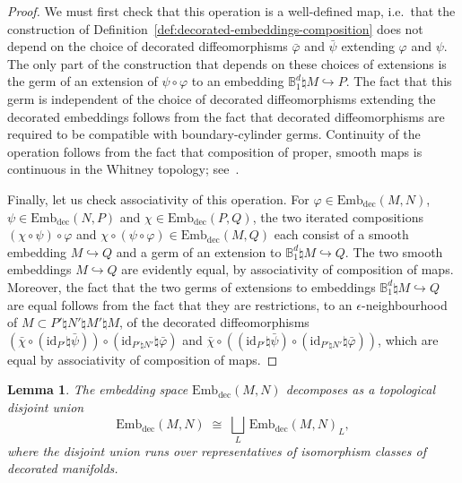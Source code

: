 \documentclass[10pt,a4paper]{amsart}
\numberwithin{equation}{section}
\newcommand{\id}{\mathrm{id}}
\newcommand{\rdec}{\mathrm{dec}}
\newcommand{\bB}{\mathbb{B}}
\newcommand{\embdec}{\ensuremath{\mathrm{Emb}_{\rdec}}}
\newtheorem{lemm}[theo]{Lemma}
\theoremstyle{definition}
\theoremstyle{remark}
\begin{document}
\begin{proof}
We must first check that this operation is a well-defined map, i.e.~that the construction of Definition~\ref{def:decorated-embeddings-composition} does not depend on the choice of decorated diffeomorphisms $\bar{\varphi}$ and $\bar{\psi}$ extending $\varphi$ and $\psi$. The only part of the construction that depends on these choices of extensions is the germ of an extension of $\psi \circ \varphi$ to an embedding $\bB_{1}^d \natural M \hookrightarrow P$. The fact that this germ is independent of the choice of decorated diffeomorphisms extending the decorated embeddings follows from the fact that decorated diffeomorphisms are required to be compatible with boundary-cylinder germs. Continuity of the operation follows from the fact that composition of proper, smooth maps is continuous in the Whitney topology; see~\cite[\S~2, Prop.~1]{Mather1969}.

Finally, let us check associativity of this operation. For $\varphi\in\embdec(M,N)$, $\psi\in\embdec(N,P)$ and $\chi\in\embdec(P,Q)$, the two iterated compositions $(\chi \circ \psi) \circ \varphi$ and $\chi \circ (\psi \circ \varphi) \in \embdec(M,Q)$ each consist of a smooth embedding $M \hookrightarrow Q$ and a germ of an extension to $\bB_{1}^d \natural M \hookrightarrow Q$. The two smooth embeddings $M \hookrightarrow Q$ are evidently equal, by associativity of composition of maps. Moreover, the fact that the two germs of extensions to embeddings $\bB_{1}^d \natural M \hookrightarrow Q$ are equal follows from the fact that they are restrictions, to an $\epsilon$-neighbourhood of $M \subset P' \natural N' \natural M' \natural M$, of the decorated diffeomorphisms $(\bar{\chi} \circ (\id_{P'} \natural \bar{\psi})) \circ (\id_{P' \natural N'} \natural \bar{\varphi})$ and $\bar{\chi} \circ ((\id_{P'} \natural \bar{\psi}) \circ (\id_{P' \natural N'} \natural \bar{\varphi}))$, which are equal by associativity of composition of maps.
\end{proof}

\begin{lemm}\label{lem:decomposition-disjoint-union}
The embedding space $\embdec(M,N)$ decomposes as a topological disjoint union
\begin{equation}\label{eq:embdec-decomposition}
\embdec(M,N) \;\cong\; \bigsqcup_L \, \embdec(M,N)_L,
\end{equation}
where the disjoint union runs over representatives of isomorphism classes of decorated manifolds.
\end{lemm}
\end{document}

